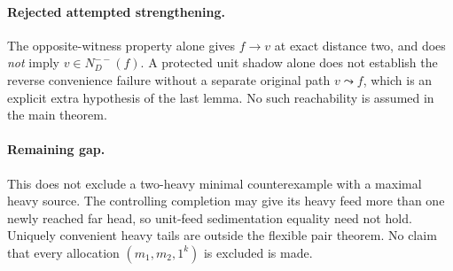 \paragraph{Rejected attempted strengthening.}
The opposite-witness property alone gives $f\to v$ at exact distance
two, and does
\emph{not} imply $v\in N_D^{--}(f)$. A protected unit shadow alone
does not establish the reverse convenience failure without a separate
original path $v\leadsto f$, which is an explicit extra hypothesis of
the last lemma. No such reachability is assumed in the main theorem.

\paragraph{Remaining gap.}
This does not exclude a two-heavy minimal counterexample with a maximal
heavy source. The controlling completion may give its heavy feed more
than one newly reached far head, so unit-feed sedimentation equality
need not hold. Uniquely convenient heavy tails are outside the flexible
pair theorem. No claim that every allocation $(m_1,m_2,1^k)$ is excluded
is made.
